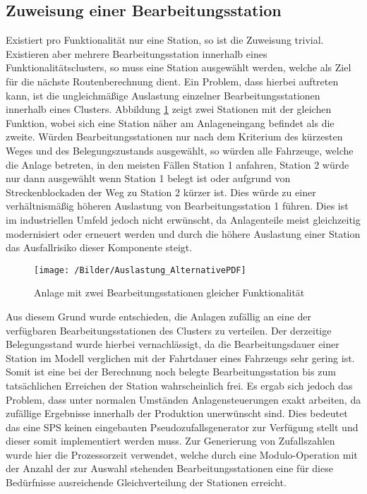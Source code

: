 		\subsection{Zuweisung einer Bearbeitungsstation}
			\label{Zuweisung_Station}
			Existiert pro Funktionalität nur eine Station, so ist die Zuweisung trivial. Existieren aber mehrere Bearbeitungsstation innerhalb eines Funktionalitätsclusters, so muss eine Station ausgewählt werden, welche als Ziel für die nächste Routenberechnung dient. Ein Problem, dass hierbei auftreten kann, ist die ungleichmäßige Auslastung einzelner Bearbeitungsstationen innerhalb eines Clusters. Abbildung \ref{Alternativen} zeigt zwei Stationen mit der gleichen Funktion, wobei sich eine Station näher am Anlageneingang befindet als die zweite. Würden Bearbeitungsstationen nur nach dem Kriterium des kürzesten Weges und des Belegungszustands ausgewählt, so würden alle Fahrzeuge, welche die Anlage betreten, in den meisten Fällen Station 1 anfahren, Station 2 würde nur dann ausgewählt wenn Station 1 belegt ist oder aufgrund von Streckenblockaden der Weg zu Station 2 kürzer ist. Dies würde zu einer verhältnismäßig höheren Auslastung von Bearbeitungsstation 1 führen. Dies ist im industriellen Umfeld jedoch nicht erwünscht, da Anlagenteile meist gleichzeitig modernisiert oder erneuert werden und durch die höhere Auslastung einer Station das Ausfallrisiko dieser Komponente steigt.
			
			\begin{figure}[h]
				\centering
				\texttt{[image: /Bilder/Auslastung\_AlternativePDF]}
				
				\vspace{0.2cm}
				\caption{Anlage mit zwei Bearbeitungsstationen gleicher Funktionalität}\label{Alternativen}
			\end{figure}
			
		
			Aus diesem Grund wurde entschieden, die Anlagen zufällig an eine der verfügbaren Bearbeitungsstationen des Clusters zu verteilen. Der derzeitige Belegungsstand wurde hierbei vernachlässigt, da die Bearbeitungsdauer einer Station im Modell verglichen mit der Fahrtdauer eines Fahrzeugs sehr gering ist. Somit ist eine bei der Berechnung noch belegte Bearbeitungsstation bis zum tatsächlichen Erreichen der Station wahrscheinlich frei.  Es ergab sich jedoch das Problem, dass unter normalen Umständen Anlagensteuerungen exakt arbeiten, da zufällige Ergebnisse innerhalb der Produktion unerwünscht sind. Dies bedeutet das eine \ac{SPS} keinen eingebauten Pseudozufallsgenerator zur Verfügung stellt und dieser somit implementiert werden muss. Zur Generierung von Zufallszahlen wurde hier die Prozessorzeit verwendet, welche durch eine Modulo-Operation mit der Anzahl der zur Auswahl stehenden Bearbeitungsstationen eine für diese Bedürfnisse ausreichende Gleichverteilung der Stationen erreicht.
		
